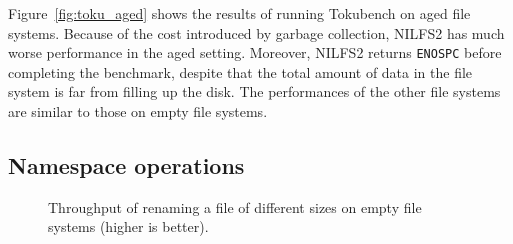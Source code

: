 Figure~\ref{fig:toku_aged} shows the results of running Tokubench on aged
file systems.
Because of the cost introduced by garbage collection,
NILFS2 has much worse performance in the aged setting.
Moreover, NILFS2 returns \texttt{ENOSPC} before completing the benchmark,
despite that the total amount of data in the file system is far from filling up
the disk.
The performances of the other file systems are similar
to those on empty file systems.

\subsection{Namespace operations}
\label{sec:micro:nso}

\begin{figure}[t]
    \centering
    \caption[File rename benchmark on empty file systems]{\label{fig:file_rename_empty}
        Throughput of renaming a file of different sizes on empty file systems (higher is better).}
\end{figure}

